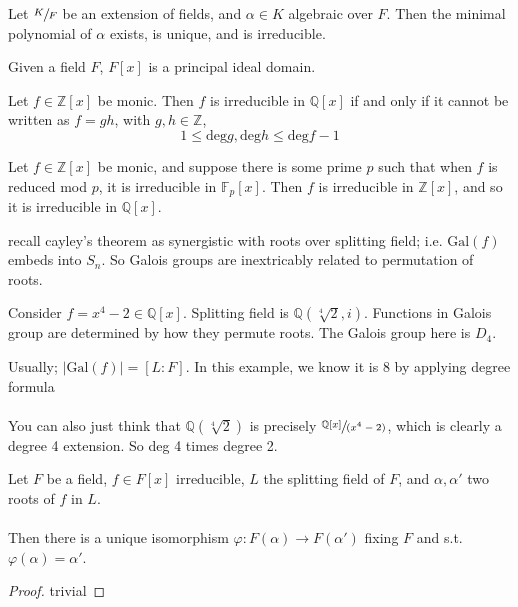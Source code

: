 \documentclass[12pt]{article}
\newenvironment{theorem}[2][Theorem]{\begin{trivlist}
    \item[\hskip \labelsep {\bfseries #1}\hskip \labelsep {\bfseries #2.}]}{\end{trivlist}}
\newenvironment{example}[1][Example]{\begin{trivlist}
    \item[\hskip \labelsep {\bfseries #1:}]}{\end{trivlist}}
\begin{document}
\begin{theorem}{:)}
    Let $\sfrac{K}{F}$ be an extension of fields, and $\alpha \in K$ algebraic over $F$. Then the minimal polynomial of $\alpha$ exists, is unique, and is irreducible. 
\end{theorem}

\begin{theorem}{:)}
    Given a field $F$, $F[x]$ is a principal ideal domain.
\end{theorem}

\begin{theorem}{:)}
    Let $f \in \mathbb{Z}[x]$ be monic. Then $f$ is irreducible in $\mathbb{Q}[x]$ if and only if it cannot be written as $f = gh$, with $g, h \in \mathbb{Z}$,
    $$1 \leq \text{deg}g, \text{deg}h \leq \text{deg}f - 1$$
\end{theorem}

\begin{theorem}{:)}
    Let $f \in \mathbb{Z}[x]$ be monic, and suppose there is some prime $p$ such that when $f$ is reduced mod $p$, it is irreducible in $\mathbb{F}_p[x]$. Then $f$ is irreducible in $\mathbb{Z}[x]$, and so it is irreducible in $\mathbb{Q}[x]$.
\end{theorem}

\begin{example}
    recall cayley's theorem as synergistic with roots over splitting field;  i.e. $\text{Gal}(f)$ embeds into $S_n$. So Galois groups are inextricably related to permutation of roots.
\end{example}

\begin{example}
    Consider $f = x^4 - 2 \in \mathbb{Q}[x]$. Splitting field is $\mathbb{Q}(\sqrt[4]{2}, i)$. Functions in Galois group are determined by how they permute roots. The Galois group here is $D_4$. 
\end{example}

\begin{example}
    Usually; $|\text{Gal}(f)| = [L : F]$. In this example, we know it is 8 by applying degree formula \\ \\
    You can also just think that $\mathbb{Q}(\sqrt[4]{2})$ is precisely $\sfrac{\mathbb{Q}[x]}{(x^4 - 2)}$, which is clearly a degree 4 extension. So deg 4 times degree 2. 
\end{example}

\begin{theorem}{galois lemma 1}
    Let $F$ be a field, $f \in F[x]$ irreducible, $L$ the splitting field of $F$, and $\alpha, \alpha'$ two roots of $f$ in $L$. \\ \\
    Then there is a unique isomorphism $\varphi: F(\alpha) \rightarrow F(\alpha')$ fixing $F$ and s.t. $\varphi(\alpha) = \alpha'$. 
    \begin{proof}
        trivial
    \end{proof}
\end{theorem}
\end{document}

